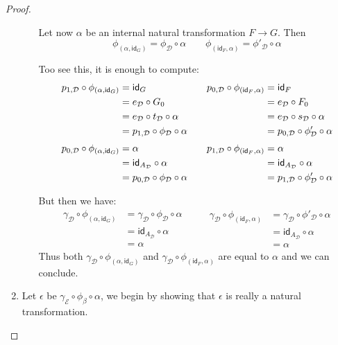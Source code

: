 \documentclass[a4paper,UKenglish,cleveref,pdftex,thm-restate,numberwithinsect]{lipics-v2021}
\newcommand{\id}[1]{\mathsf{id}_{#1}}
\begin{document}
\begin{proof}
\begin{enumerate}
\begin{itemize}
				Let now $\alpha$ be an internal natural transformation $F\to G$. Then
				\[\phi_{(\alpha, \id{G})}= \phi_{\mathcal{D}}\circ \alpha \qquad \phi_{(\id{F}, \alpha)}= \phi'_{\mathcal{D}}\circ \alpha\]
				
				Too see this, it is enough to compute:
				\[\begin{split}
					p_{1, \mathcal{D}}\circ \phi_{(\alpha, \id{G})}&= \id{G}\\&=e_{\mathcal{D}}\circ G_0						\\&=e_{\mathcal{D}}\circ t_{\mathcal{D}}\circ \alpha 
					\\&=p_{1, \mathcal{D}}\circ \phi_{\mathcal{D}}\circ \alpha
					\\[.2\baselineskip] p_{0, \mathcal{D}}\circ \phi_{(\alpha, \id{G})}&=\alpha 					\\&=\id{A_{\mathcal{D}}}\circ \alpha
					\\&= p_{0, \mathcal{D}}\circ \phi_{\mathcal{D}}\circ \alpha
				\end{split} \qquad \begin{split}
					p_{0, \mathcal{D}}\circ \phi_{(\id{F}, \alpha)}&=\id{F}\\&=e_{\mathcal{D}}\circ F_0
					\\&=e_{\mathcal{D}}\circ s_{\mathcal{D}} \circ \alpha 
					\\&=p_{0, \mathcal{D}}\circ \phi'_{\mathcal{D}}\circ \alpha \\[.2\baselineskip]				p_{1, \mathcal{D}}\circ \phi_{(\id{F}, \alpha)}&=\alpha 					\\&=\id{A_{\mathcal{D}}}\circ \alpha
					\\&= p_{1, \mathcal{D}}\circ \phi'_{\mathcal{D}}\circ \alpha
				\end{split}\]
		
				But then we have:
				\[\begin{split}
				\gamma_{\mathcal{D}}\circ \phi_{(\alpha, \id{G})}&=\gamma_{\mathcal{D}}\circ \phi_{\mathcal{D}}\circ \alpha\\&=\id{A_{\mathcal{D}}}\circ \alpha\\&= \alpha 
				\end{split} \qquad \begin{split}
				\gamma_{\mathcal{D}}\circ \phi_{(\id{F}, \alpha)}&= \gamma_{\mathcal{D}}\circ \phi'_{\mathcal{D}}\circ \alpha\\&=\id{A_{\mathcal{D}}}\circ \alpha \\&= \alpha 
				\end{split}
				\]
				Thus both $\gamma_{\mathcal{D}}\circ \phi_{(\alpha, \id{G})}$ and $\gamma_{\mathcal{D}}\circ \phi_{(\id{F}, \alpha)}$ are equal to $\alpha$ and we can conclude.
			\end{itemize}
			\item  Let $\epsilon$ be $\gamma_{\mathcal{E}}\circ \phi_{\beta}\circ \alpha$, we begin by showing that $\epsilon$ is really a natural transformation.
			

\end{enumerate}
\end{proof}
\end{document}
